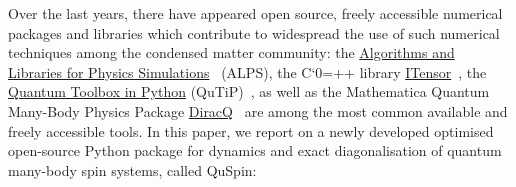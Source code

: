\documentclass{SciPost}
\newcommand\0{\scalebox{-1}[1]{0}}
\let\svttfamily\ttfamily
\renewcommand\ttfamily{\svttfamily\catcode`0=\active }
\renewcommand\texttt{\bgroup\ttfamily\texttthelp}
\def\texttthelp#1{#1\egroup}
\begin{document}
Over the last years, there have appeared open source, freely accessible numerical packages and libraries which contribute to widespread the use of such numerical techniques among the condensed matter community: the \href{http://alps.comp-phys.org/mediawiki/index.php/Main_Page}{Algorithms and Libraries for Physics Simulations}~\cite{alet05,albuquerque2007,bauer11,dolfi14} (ALPS), the C\texttt{++} library \href{http://itensor.org/}{ITensor}~\cite{ITensor}, the \href{http://qutip.org/}{Quantum Toolbox in Python} (QuTiP)~\cite{johansson2012,johansson2013}, as well as the Mathematica Quantum Many-Body Physics Package \href{http://diracq.org/}{DiracQ}~\cite{wright_13} are among the most common available and freely accessible tools. In this paper, we report on a newly developed optimised open-source Python package for dynamics and exact diagonalisation of quantum many-body spin systems, called QuSpin:
\end{document}
